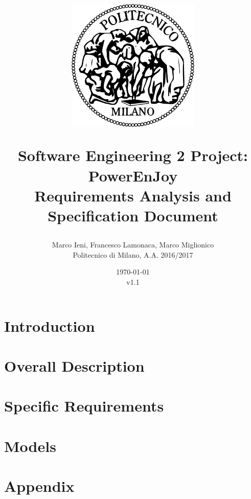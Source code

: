 \documentclass[a4paper, 12pt]{report}
\title{
	\begin{figure}[h]
		\centering
		\includegraphics{../common_resources/logo_polimi.png}
	\end{figure}
	\vspace{30px}
	Software Engineering 2 Project: PowerEnJoy \\ \vspace{1em}
	\textbf{R}equirements \textbf{A}nalysis and \textbf{S}pecification \textbf{D}ocument
}
\author{Marco Ieni, Francesco Lamonaca, Marco Miglionico\\Politecnico di Milano, A.A. 2016/2017}
\date{\today\\v1.1}
\begin{document}
\maketitle
\tableofcontents

\chapter{Introduction}
\label{ch:introduction}





% 
% 

\chapter{Overall Description}
\label{ch:overall_description}







\chapter{Specific Requirements}
\label{ch:specific_requirements}


% 



\chapter{Models}
\label{ch:models}







\appendix
\chapter{Appendix}

\end{document}
